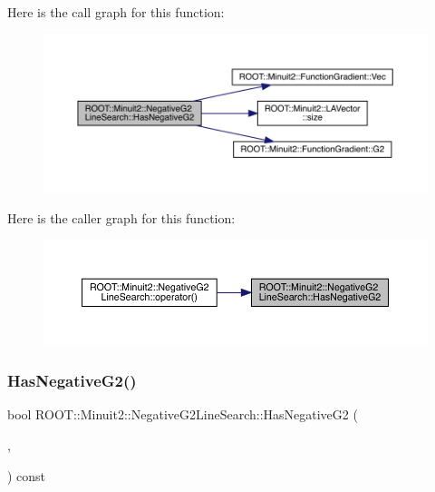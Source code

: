 Here is the call graph for this function\+:
\nopagebreak
\begin{figure}[H]
\begin{center}
\leavevmode
\includegraphics[width=350pt]{d3/d6b/classROOT_1_1Minuit2_1_1NegativeG2LineSearch_a5450b0e5a0144e9c3e6028e8ae4a2c76_cgraph}
\end{center}
\end{figure}
Here is the caller graph for this function\+:
\nopagebreak
\begin{figure}[H]
\begin{center}
\leavevmode
\includegraphics[width=350pt]{d3/d6b/classROOT_1_1Minuit2_1_1NegativeG2LineSearch_a5450b0e5a0144e9c3e6028e8ae4a2c76_icgraph}
\end{center}
\end{figure}
\mbox{\label{classROOT_1_1Minuit2_1_1NegativeG2LineSearch_a5450b0e5a0144e9c3e6028e8ae4a2c76}} 
\subsubsection{\texorpdfstring{HasNegativeG2()}{HasNegativeG2()}\hspace{0.1cm}{\footnotesize\ttfamily [2/3]}}
{\footnotesize\ttfamily bool R\+O\+O\+T\+::\+Minuit2\+::\+Negative\+G2\+Line\+Search\+::\+Has\+Negative\+G2 (\begin{DoxyParamCaption}\item[{const \mbox{\hyperlink{classROOT_1_1Minuit2_1_1FunctionGradient}{Function\+Gradient}} \&}]{,  }\item[{const \mbox{\hyperlink{classROOT_1_1Minuit2_1_1MnMachinePrecision}{Mn\+Machine\+Precision}} \&}]{ }\end{DoxyParamCaption}) const}


